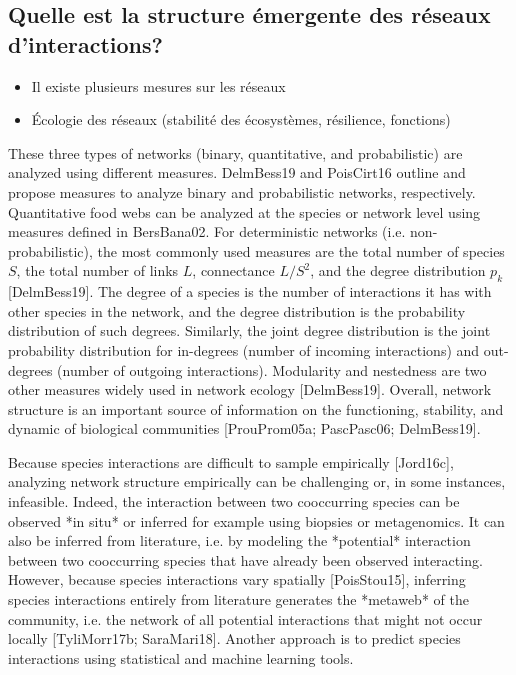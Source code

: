 \subsection{Quelle est la structure émergente des réseaux d'interactions?} 

\begin{itemize}
    \item Il existe plusieurs mesures sur les réseaux 
    \item Écologie des réseaux (stabilité des écosystèmes, résilience, fonctions)
\end{itemize}

These three types of networks (binary, quantitative, and probabilistic) are
analyzed using different measures. DelmBess19 and PoisCirt16 outline and
propose measures to analyze binary and probabilistic networks, respectively.
Quantitative food webs can be analyzed at the species or network level using
measures defined in BersBana02. For deterministic networks (i.e.
non-probabilistic), the most commonly used measures are the total number of
species $S$, the total number of links $L$, connectance $L/S^2$, and the degree
distribution $p_k$ [DelmBess19]. The degree of a species is the number of
interactions it has with other species in the network, and the degree
distribution is the probability distribution of such degrees. Similarly, the
joint degree distribution is the joint probability distribution for in-degrees
(number of incoming interactions) and out-degrees (number of outgoing
interactions). Modularity and nestedness are two other measures widely used in
network ecology [DelmBess19]. Overall, network structure is an important source
of information on the functioning, stability, and dynamic of biological
communities [ProuProm05a; PascPasc06; DelmBess19].

Because species interactions are difficult to sample empirically [Jord16c],
analyzing network structure empirically can be challenging or, in some
instances, infeasible. Indeed, the interaction between two cooccurring species
can be observed *in situ* or inferred for example using biopsies or
metagenomics. It can also be inferred from literature, i.e. by modeling the
*potential* interaction between two cooccurring species that have already been
observed interacting. However, because species interactions vary spatially
[PoisStou15], inferring species interactions entirely from literature generates
the *metaweb* of the community, i.e. the network of all potential interactions
that might not occur locally [TyliMorr17b; SaraMari18]. Another approach is to
predict species interactions using statistical and machine learning tools.

